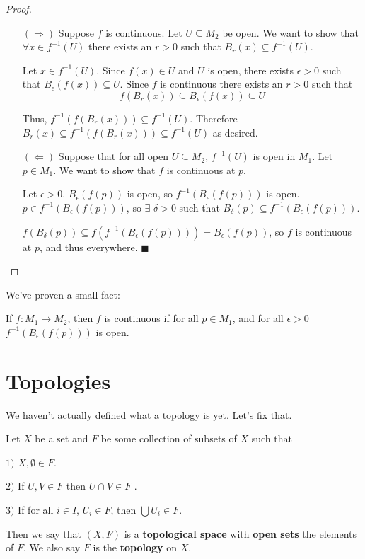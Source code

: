 \begin{proof}
\begin{itemize}
\item[$(\Rightarrow)$] Suppose $f$ is continuous. Let $U \subseteq M_2$ be open.  We want to show that $\forall x \in f^{-1} (U)$ there exists an $r>0$ such that $B_r (x) \subseteq f^{-1} (U)$.

Let $x\in f^{-1} (U)$.  Since $f(x)\in U$ and $U$ is open, there exists $\epsilon >0$ such that $B_\epsilon (f(x)) \subseteq U$.  Since $f$ is continuous there exists an $r>0$ such that 
\[f(B_r (x)) \subseteq B_\epsilon (f(x)) \subseteq U\]

Thus, $f^{-1} (f(B_r (x))) \subseteq f^{-1} (U)$.  Therefore $B_r (x) \subseteq f^{-1} (f(B_r (x))) \subseteq f^{-1} (U)$ as desired.

\item[$(\Leftarrow)$] Suppose that for all open $U\subseteq M_{2}$, $f^{-1}(U)$ is open in $M_{1}$.  Let $p \in M_{1}$.  We want to show that $f$ is continuous at $p$.

Let $\epsilon > 0$.  $B_{\epsilon}(f(p))$ is open, so $f^{-1}(B_{\epsilon}(f(p)))$ is open.  $p\in f^{-1}(B_{\epsilon}(f(p)))$, so $\exists$ $\delta>0$ such that $B_{\delta}(p)\subseteq f^{-1}(B_{\epsilon}(f(p)))$.

 $f(B_{\delta}(p))\subseteq f(f^{-1}(B_{\epsilon}(f(p))))=B_{\epsilon}(f(p))$, so $f$ is continuous at $p$, and thus everywhere.  $\blacksquare$
 \end{itemize}
 \end{proof}
 
 We've proven a small fact:
\begin{smallfact}  If $f : M_{1} \rightarrow M_{2}$, then $f$ is continuous if for all $p\in M_{1}$, and for all $\epsilon>0$ $f^{-1}(B_{\epsilon}(f(p)))$ is open.
\end{smallfact}
 
\section{Topologies}
We haven't actually defined what a topology is yet.  Let's fix that.

\begin{definition} Let $X$ be a set and $F$ be some collection of subsets of $X$ such that
 	
		$1)$ $X,\emptyset \in F$.
		
		$2)$ If $U,V \in F$ then $U\cap V \in F$ .
		
		$3)$ If for all $i\in I$, $U_{i} \in F$, then $\bigcup U_{i} \in F$.
		
	Then we say that $(X,F)$ is a {\bf topological space} with {\bf open sets} the elements of $F$.  We also 		say $F$ is the  {\bf topology} on $X$.
\end{definition}

